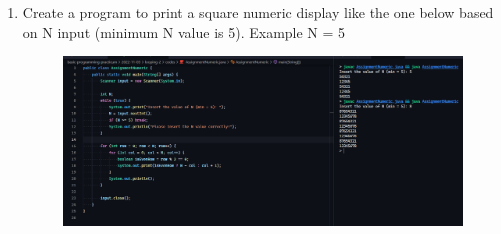 \documentclass[12pt,titlepage]{article}
\begin{document}
\begin{enumerate}
    \item {
        Create a program to print a square numeric display like the one below based on N input (minimum N value is 5). Example N = 5

        \begin{figure}[h]
            \centering
            \includegraphics[width=.8\textwidth]{./images/assignment-numeric.png}
        \end{figure}
    }
\end{enumerate}
\end{document}
